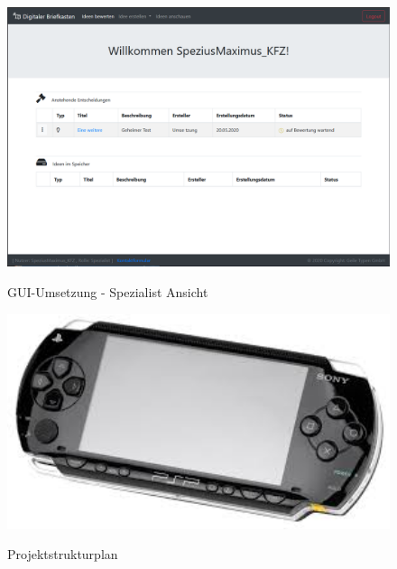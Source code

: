\begin{figure}[h]
    \centering
    \begin{minipage}[t]{1\textwidth}
        \caption{GUI-Umsetzung - Spezialist Ansicht }
        \includegraphics[width=1\textwidth]{img/spezialist-umsetzung.png}\\
    \end{minipage}
\end{figure}

\pagebreak
\clearpage

\label{PSP}
\begin{figure}[h]
    \centering
    \begin{minipage}[t]{1\textwidth}
        \caption{Projektstrukturplan}
        \includegraphics[width=1\textwidth]{img/psp.jpg}\\%
    \end{minipage}
\end{figure}

